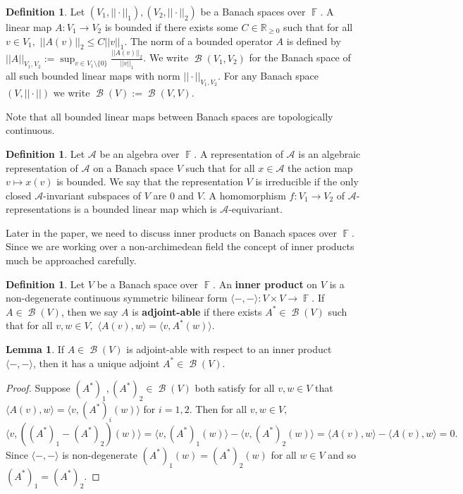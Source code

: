 \documentclass[12pt,reqno]{amsart}
\theoremstyle{definition}
\newtheorem{lem}[thm]{Lemma}
\newtheorem{defn}[thm]{Definition}
\DeclareMathOperator{\bF}{\mathbb{F}}
\DeclareMathOperator{\cB}{\mathcal{B}}
\begin{document}
\begin{defn}
    Let $(V_1,||\cdot||_1),(V_2,||\cdot||_2)$ be a Banach spaces over $\bF.$ A linear map $A: V_1 \rightarrow V_2$ is bounded if there exists some $C \in \mathbb{R}_{\geq 0}$ such that for all $v \in V_1,$ 
    $||A(v)||_{2} \leq C ||v||_1.$ The norm of a bounded operator $A$ is defined by 
    $||A||_{V_1,V_2}:= \sup_{v \in V_1\setminus \{0\}} \frac{||A(v)||_2}{||v||_1}$. We write $\cB(V_1,V_2)$ for the Banach space of all such bounded linear maps with norm $||\cdot||_{V_1,V_2}$. For any Banach space $(V,||\cdot||)$ we write $\cB(V):= \cB(V,V).$ 
\end{defn}

Note that all bounded linear maps between Banach spaces are topologically continuous. 

\begin{defn}
    Let $\mathcal{A}$ be an algebra over $\bF.$ A representation of $\mathcal{A}$ is an algebraic representation of $\mathcal{A}$ on a Banach space $V$ such that for all $x \in \mathcal{A}$ the action map $v \mapsto x(v)$ is bounded. We say that the representation $V$ is irreducible if the only closed $\mathcal{A}$-invariant subspaces of $V$ are $0$ and $V.$ A homomorphism $f: V_1\rightarrow V_2$ of $\mathcal{A}$-representations is a bounded linear map which is $\mathcal{A}$-equivariant.
\end{defn}

Later in the paper, we need to discuss inner products on Banach spaces over $\bF.$ Since we are working over a non-archimedean field the concept of inner products much be approached carefully.

\begin{defn}\label{defn inner products}
    Let $V$ be a Banach space over $\bF.$ An \textbf{inner product} on $V$ is a non-degenerate continuous symmetric bilinear form $\langle-,-\rangle: V \times V\rightarrow \bF$. If $A\in \cB(V)$, then we say $A$ is \textbf{adjoint-able} if there exists $A^{*} \in \cB(V)$ such that for all $v,w \in V,$ $\langle A(v),w \rangle = \langle v, A^{*}(w) \rangle.$
\end{defn}

\begin{lem}\label{lem uniqueness of adjoints}
    If $A \in \cB(V)$ is adjoint-able with respect to an inner product $\langle-,-\rangle$, then it has a unique adjoint $A^* \in \cB(V)$.
\end{lem}
\begin{proof}
    Suppose $(A^*)_1,(A^{*})_2\in \cB(V)$ both satisfy for all $v,w \in V$ that $\langle A(v),w \rangle = \langle v,(A^*)_i(w) \rangle$ for $i=1,2.$ Then for all $v,w \in V,$
    $$\langle v,\left( (A^*)_1 - (A^*)_2 \right)(w) \rangle = \langle v, (A^*)_1(w) \rangle - \langle v, (A^*)_2(w) \rangle = \langle A(v),w \rangle- \langle A(v),w \rangle =0.$$ Since $\langle - , - \rangle$ is non-degenerate $(A^*)_1(w) = (A^*)_2(w)$ for all $w \in V$ and so $(A^*)_1 = (A^*)_2.$
\end{proof}
\end{document}

